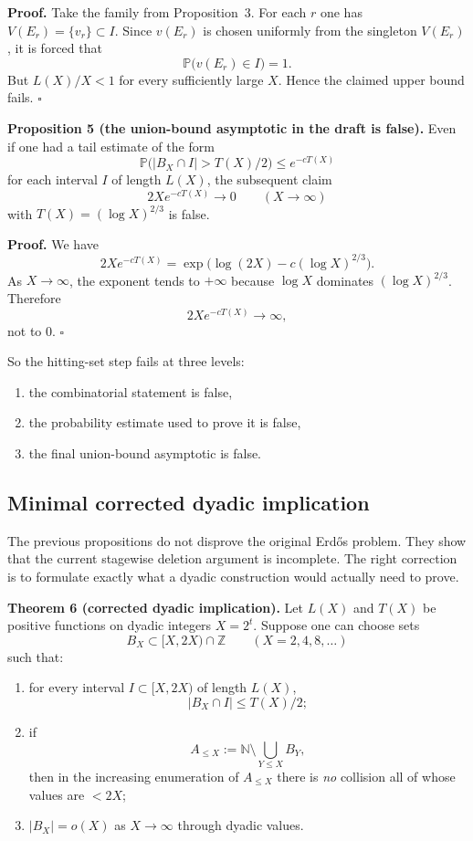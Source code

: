 \textbf{Proof.}
Take the family from Proposition~3. For each $r$ one has $V(E_r)=\{v_r\}\subset I$. Since $v(E_r)$ is chosen uniformly from the singleton $V(E_r)$, it is forced that
\[
\mathbb P\bigl(v(E_r)\in I\bigr)=1.
\]
But $L(X)/X<1$ for every sufficiently large $X$. Hence the claimed upper bound fails. \hfill$\square$

\textbf{Proposition 5 (the union-bound asymptotic in the draft is false).}
Even if one had a tail estimate of the form
\[
\mathbb P\bigl(|B_X\cap I|>T(X)/2\bigr)\le e^{-cT(X)}
\]
for each interval $I$ of length $L(X)$, the subsequent claim
\[
2X e^{-cT(X)}\to 0
\qquad (X\to\infty)
\]
with $T(X)=(\log X)^{2/3}$ is false.

\textbf{Proof.}
We have
\[
2X e^{-cT(X)}=
\exp\!\bigl(\log(2X)-c(\log X)^{2/3}\bigr).
\]
As $X\to\infty$, the exponent tends to $+\infty$ because $\log X$ dominates $(\log X)^{2/3}$. Therefore
\[
2X e^{-cT(X)}\to \infty,
\]
not to $0$. \hfill$\square$

\medskip

So the hitting-set step fails at three levels:
\begin{enumerate}
\item the combinatorial statement is false,
\item the probability estimate used to prove it is false,
\item the final union-bound asymptotic is false.
\end{enumerate}

\subsection{Minimal corrected dyadic implication}

The previous propositions do not disprove the original Erd\H{o}s problem. They show that the current stagewise deletion argument is incomplete. The right correction is to formulate exactly what a dyadic construction would actually need to prove.

\textbf{Theorem 6 (corrected dyadic implication).}
Let $L(X)$ and $T(X)$ be positive functions on dyadic integers $X=2^t$. Suppose one can choose sets
\[
B_X\subset [X,2X)\cap \mathbb Z
\qquad (X=2,4,8,\dots)
\]
such that:

\begin{enumerate}
\item[(i)] for every interval $I\subset [X,2X)$ of length $L(X)$,
\[
|B_X\cap I|\le T(X)/2;
\]

\item[(ii)] if
\[
A_{\le X}:=\mathbb N\setminus \bigcup_{Y\le X} B_Y,
\]
then in the increasing enumeration of $A_{\le X}$ there is \emph{no} collision all of whose values are $<2X$;

\item[(iii)] $|B_X|=o(X)$ as $X\to\infty$ through dyadic values.
\end{enumerate}

